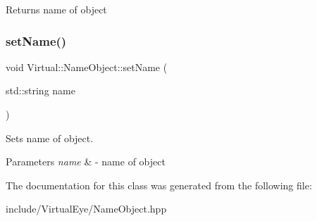 \begin{DoxyReturn}{Returns}
name of object 
\end{DoxyReturn}
\hypertarget{class_virtual_1_1_name_object_a83cf1d1cf7b337169f060a64b6630eff}{}\label{class_virtual_1_1_name_object_a83cf1d1cf7b337169f060a64b6630eff} 
\subsubsection{\texorpdfstring{set\+Name()}{setName()}}
{\footnotesize\ttfamily void Virtual\+::\+Name\+Object\+::set\+Name (\begin{DoxyParamCaption}\item[{std\+::string}]{name }\end{DoxyParamCaption})\hspace{0.3cm}{\ttfamily [inline]}}



Sets name of object. 


\begin{DoxyParams}{Parameters}
{\em name} & -\/ name of object \\
\hline
\end{DoxyParams}


The documentation for this class was generated from the following file\+:\begin{DoxyCompactItemize}
\item 
include/\+Virtual\+Eye/Name\+Object.\+hpp\end{DoxyCompactItemize}
